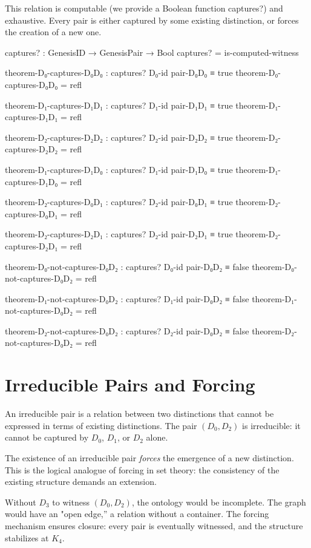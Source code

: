 \documentclass[11pt,a4paper]{book}
\def\texttt#1{#1}%
\begin{document}
This relation is computable (we provide a Boolean function \texttt{captures?}) and exhaustive.
Every pair is either captured by some existing distinction, or forces the creation of a new one.

\begin{code}
captures? : GenesisID → GenesisPair → Bool
captures? = is-computed-witness

theorem-D₀-captures-D₀D₀ : captures? D₀-id pair-D₀D₀ ≡ true
theorem-D₀-captures-D₀D₀ = refl

theorem-D₁-captures-D₁D₁ : captures? D₁-id pair-D₁D₁ ≡ true
theorem-D₁-captures-D₁D₁ = refl

theorem-D₂-captures-D₂D₂ : captures? D₂-id pair-D₂D₂ ≡ true
theorem-D₂-captures-D₂D₂ = refl

theorem-D₁-captures-D₁D₀ : captures? D₁-id pair-D₁D₀ ≡ true
theorem-D₁-captures-D₁D₀ = refl

theorem-D₂-captures-D₀D₁ : captures? D₂-id pair-D₀D₁ ≡ true
theorem-D₂-captures-D₀D₁ = refl

theorem-D₂-captures-D₂D₁ : captures? D₂-id pair-D₂D₁ ≡ true
theorem-D₂-captures-D₂D₁ = refl

theorem-D₀-not-captures-D₀D₂ : captures? D₀-id pair-D₀D₂ ≡ false
theorem-D₀-not-captures-D₀D₂ = refl

theorem-D₁-not-captures-D₀D₂ : captures? D₁-id pair-D₀D₂ ≡ false
theorem-D₁-not-captures-D₀D₂ = refl

theorem-D₂-not-captures-D₀D₂ : captures? D₂-id pair-D₀D₂ ≡ false
theorem-D₂-not-captures-D₀D₂ = refl
\end{code}

\section{Irreducible Pairs and Forcing}

An irreducible pair is a relation between two distinctions that cannot be expressed in terms of existing distinctions.
The pair $(D_0, D_2)$ is irreducible: it cannot be captured by $D_0$, $D_1$, or $D_2$ alone.

The existence of an irreducible pair \emph{forces} the emergence of a new distinction.
This is the logical analogue of forcing in set theory: the consistency of the existing structure demands an extension.

Without $D_3$ to witness $(D_0, D_2)$, the ontology would be incomplete.
The graph would have an "open edge,'' a relation without a container.
The forcing mechanism ensures closure: every pair is eventually witnessed, and the structure stabilizes at $K_4$.
\end{document}

